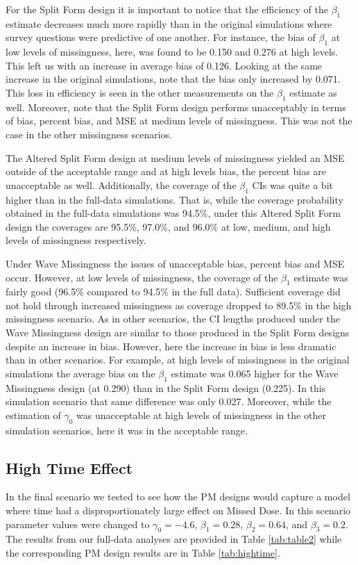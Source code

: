 \documentclass{svjour3}\usepackage[]{graphicx}\usepackage[]{color}
\begin{document}
For the Split Form design it is important to notice that the efficiency of the $\beta_1$ estimate decreases much more rapidly than in the original simulations where survey questions were predictive of one another. For instance, the bias of $\beta_1$ at low levels of missingness, here, was found to be 0.150 and 0.276 at high levels. This left us with an increase in average bias of 0.126. Looking at the same increase in the original simulations, note that the bias only increased by 0.071. This loss in efficiency is seen in the other measurements on the $\beta_1$ estimate as well. Moreover, note that the Split Form design performs unacceptably in terms of bias, percent bias, and MSE at medium levels of missingness. This was not the case in the other missingness scenarios. \par

The Altered Split Form design at medium levels of missingness yielded an MSE outside of the acceptable range and at high levels bias, the percent bias are unacceptable as well. Additionally, the coverage of the $\beta_1$ CIs was quite a bit higher than in the full-data simulations. That is, while the coverage probability obtained in the full-data simulations was 94.5\%, under this Altered Split Form design the coverages are 95.5\%, 97.0\%, and 96.0\% at low, medium, and high levels of missingness respectively. \par

Under Wave Missingness the issues of unacceptable bias, percent bias and MSE occur. However, at low levels of missingness, the coverage of the $\beta_1$ estimate was fairly good (96.5\% compared to 94.5\% in the full data). Sufficient coverage did not hold through increased missingness as coverage dropped to 89.5\% in the high missingness scenario. As in other scenarios, the CI lengths produced under the Wave Missingness design are similar to those produced in the Split Form designs despite an increase in bias. However, here the increase in bias is less dramatic than in other scenarios. For example, at high levels of missingness in the original simulations the average bias on the $\beta_1$ estimate was 0.065 higher for the Wave Missingness design (at 0.290) than in the Split Form design (0.225). In this simulation scenario that same difference was only 0.027. Moreover, while the estimation of $\gamma_0$ was unacceptable at high levels of missingness in the other simulation scenarios, here it was in the acceptable range.\par

\subsection{High Time Effect}
\label{sec:3.4}
In the final scenario we tested to see how the PM designs would capture a model where time had a disproportionately large effect on Missed Dose. In this scenario parameter values were changed to $\gamma_0 = -4.6$, $\beta_1 = 0.28$, $\beta_2 = 0.64$, and $\beta_3 = 0.2$. The results from our full-data analyses are provided in Table \ref{tab:table2} while the corresponding PM design results are in Table \ref{tab:hightime}. \par
\end{document}
